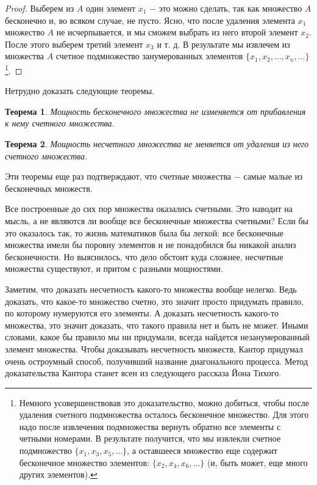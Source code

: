 \documentclass{article}
\newtheorem{theorem}{Теорема}[section]
\begin{document}
\begin{proof}
Выберем из \(A\) один элемент \(x_1\) \(-\) это можно сделать, так как множество \(A\) бесконечно и, во всяком случае, не пусто. Ясно, что после удаления элемента \(x_1\) множество \(A\) не исчерпывается, и мы сможем выбрать из него второй элемент \(x_2\). После этого выберем третий элемент \(x_3\) и т. д. В результате мы извлечем из множества \(A\) счетное подмножество занумерованных элементов \(\{x_1, x_2, ..., x_n, ...\}\)
\footnote[1]
{
Немного усовершенствовав это доказательство, можно добиться, чтобы после удаления счетного подмножества осталось бесконечное множество. Для этого надо после извлечения подмножества вернуть обратно все элементы с четными номерами. В результате получится, что мы извлекли счетное подмножество \(\{x_1, x_3, x_5, ...\}\), а оставшееся множество еще содержит бесконечное множество элементов: \(\{x_2, x_4, x_6, ...\}\) (и, быть может, еще много других элементов).
}.
\end{proof}

Нетрудно доказать следующие теоремы.

\begin{theorem}
Мощность бесконечного множества не изменяется от прибавления к нему счетного множества.
\end{theorem}

\begin{theorem}
Мощность несчетного множества не меняется от удаления из него счетного множества.
\end{theorem}

Эти теоремы еще раз подтверждают, что счетные множества \(-\) самые малые из бесконечных множеств. \newline

Все построенные до сих пор множества оказались счетными. Это наводит на мысль, а не являются ли вообще все бесконечные множества счетными? Если бы это оказалось так, то жизнь математиков была бы легкой: все бесконечные множества имели бы поровну элементов и не понадобился бы никакой анализ бесконечности. Но выяснилось, что дело обстоит куда сложнее, несчетные множества существуют, и притом с разными мощностями.

Заметим, что доказать несчетность какого-то множества вообще нелегко. Ведь доказать, что какое-то множество счетно, это значит просто придумать правило, по которому нумеруются его элементы. А доказать несчетность какого-то множества, это значит доказать, что такого правила нет и быть не может. Иными словами, какое бы правило мы ни придумали, всегда найдется незанумерованный элемент множества. Чтобы доказывать несчетность множеств, Кантор придумал очень остроумный способ, получивший название диагонального процесса. Метод доказательства Кантора станет ясен из следующего рассказа Йона Тихого. \newline
\end{document}
